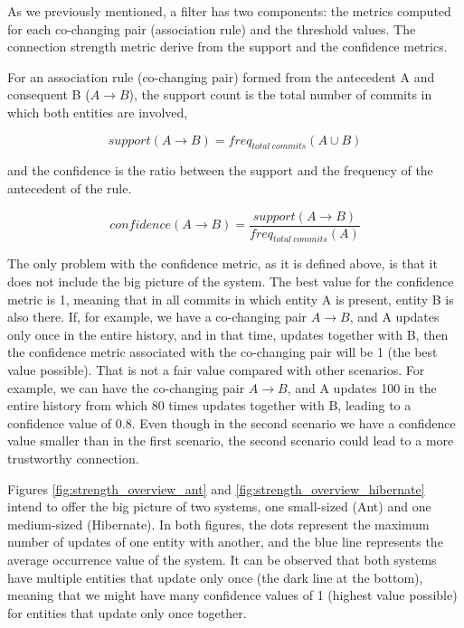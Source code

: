 \documentclass[runningheads]{comsis2}
\begin{document}
As we previously mentioned, a filter has two components: the metrics computed for each co-changing pair (association rule) and the threshold values. The connection strength metric derive from the support and the confidence metrics.

For an association rule (co-changing pair) formed from the antecedent A and consequent B ($A \rightarrow B$), 
the support count is the total number of commits in which both entities are involved,


\begin{equation}
support (A \rightarrow B) = freq_{total\ commits} {(A \cup B)}
\end{equation}

and the confidence is the ratio between the support and the frequency of the antecedent of the rule.

\begin{equation}
confidence (A \rightarrow B) =\frac{support (A \rightarrow B) }{freq_{total\ commits}(A)}
\end{equation}


The only problem with the confidence metric, as it is defined above, is that it does not include the big picture of the system.
The best value for the confidence metric is 1, meaning that in all commits in which entity A is present, entity B is also there. If, for example, we have a co-changing pair $A \rightarrow B$, and A updates only once in the entire history, and in that time, updates together with B, then the confidence metric associated with the co-changing pair will be 1 (the best value possible). That is not a fair value compared with other scenarios. For example, we can have the co-changing pair $A \rightarrow B$, and A updates 100 in the entire history from which 80 times updates together with B, leading to a confidence value of 0.8.
Even though in the second scenario we have a confidence value smaller than in the first scenario, the second scenario could lead to a more trustworthy connection.


Figures \ref{fig:strength_overview_ant} and \ref{fig:strength_overview_hibernate}  intend to offer the big picture of two systems, one small-sized (Ant) and one medium-sized (Hibernate). In both figures, the dots represent the maximum number of updates of one entity with another, and the blue line represents the average occurrence value of the system.
It can be observed that both systems have multiple entities that update only once (the dark line at the bottom), meaning that we might have many confidence values of 1 (highest value possible) for entities that update only once together.
\end{document}
